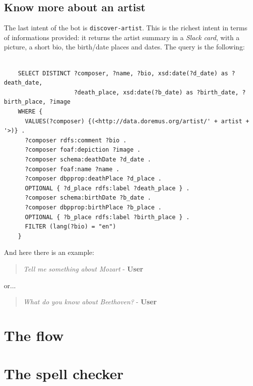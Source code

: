 \documentclass[a4paper,12pt]{report}
\begin{document}
	\subsection{Know more about an artist}
	The last intent of the bot is \texttt{discover-artist}. This is the richest intent in terms of informations provided: it returns the artist summary in a \textit{Slack card}, with a picture, a short bio, the birth/date places and dates.
	The query is the following:
	\begin{lstlisting}
	
	SELECT DISTINCT ?composer, ?name, ?bio, xsd:date(?d_date) as ?death_date,
	                ?death_place, xsd:date(?b_date) as ?birth_date, ?birth_place, ?image
	WHERE {
	  VALUES(?composer) {(<http://data.doremus.org/artist/' + artist + '>)} .
	  ?composer rdfs:comment ?bio .
	  ?composer foaf:depiction ?image .
	  ?composer schema:deathDate ?d_date .
	  ?composer foaf:name ?name .
	  ?composer dbpprop:deathPlace ?d_place .
	  OPTIONAL { ?d_place rdfs:label ?death_place } .
	  ?composer schema:birthDate ?b_date .
	  ?composer dbpprop:birthPlace ?b_place .
	  OPTIONAL { ?b_place rdfs:label ?birth_place } .
	  FILTER (lang(?bio) = "en")
	}
	\end{lstlisting}
	And here there is an example:
	\begin{verse}
		\textit{Tell me something about Mozart} - \textbf{User}\\
	\end{verse}
	or...
	\begin{verse}
		\textit{What do you know about Beethoven?} - \textbf{User}\\
	\end{verse}

	\section{The flow}
	\section{The spell checker}
	
\end{document}
